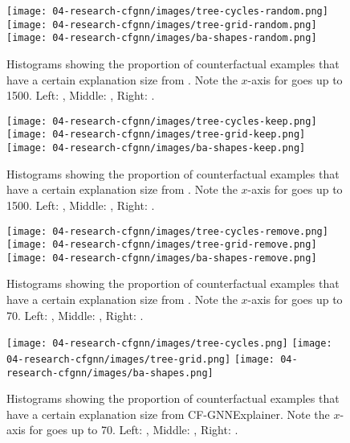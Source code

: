 \begin{figure*}[]

    \centering

    \texttt{[image: 04-research-cfgnn/images/tree-cycles-random.png]}
    \texttt{[image: 04-research-cfgnn/images/tree-grid-random.png]}
    \texttt{[image: 04-research-cfgnn/images/ba-shapes-random.png]}
    
        \caption{Histograms showing the proportion of counterfactual examples that have a certain explanation size from \baserand{}. Note the $x$-axis for \synone{} goes up to 1500. Left: \synfour{}, Middle: \synfive{}, Right: \synone{}.  }
        \label{fig:random-explanation-size}
        \bigskip \bigskip
        
    \texttt{[image: 04-research-cfgnn/images/tree-cycles-keep.png]}
    \texttt{[image: 04-research-cfgnn/images/tree-grid-keep.png]}
    \texttt{[image: 04-research-cfgnn/images/ba-shapes-keep.png]}
    
        \caption{Histograms showing the proportion of counterfactual examples that have a certain explanation size from \basekeep{}. Note the $x$-axis for \synone{} goes up to 1500. Left: \synfour{}, Middle: \synfive{}, Right: \synone{}. }
        \label{fig:keep-explanation-size}
        \bigskip \bigskip
        
        
    \texttt{[image: 04-research-cfgnn/images/tree-cycles-remove.png]}
    \texttt{[image: 04-research-cfgnn/images/tree-grid-remove.png]}
    \texttt{[image: 04-research-cfgnn/images/ba-shapes-remove.png]}
    
        \caption{Histograms showing the proportion of counterfactual examples that have a certain explanation size from \baserm{}. Note the $x$-axis for \synone{} goes up to 70. Left: \synfour{}, Middle: \synfive{}, Right: \synone{}. }
        \label{fig:remove-explanation-size}
        \bigskip \bigskip
        
    

    \texttt{[image: 04-research-cfgnn/images/tree-cycles.png]}
    \texttt{[image: 04-research-cfgnn/images/tree-grid.png]}
    \texttt{[image: 04-research-cfgnn/images/ba-shapes.png]}
    
        \caption{Histograms showing the proportion of counterfactual examples that have a certain explanation size from CF-GNNExplainer. Note the $x$-axis for \synone{} goes up to 70. Left: \synfour{}, Middle: \synfive{}, Right: \synone{}. }
        \label{fig:explanation-size}
        
\end{figure*}
